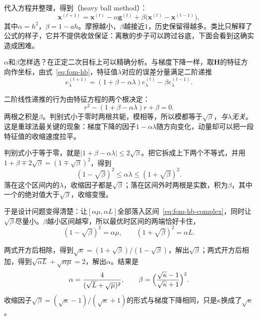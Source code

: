 代入方程并整理，得到（heavy ball method）：
\begin{equation}
 \bm{x}^{(t+1)}=\bm{x}^{(t)}-\alpha\bm{g}^{(t)}+\beta\bigl(\bm{x}^{(t)}-\bm{x}^{(t-1)}\bigr),
 \label{eq:fom-hb}
\end{equation}
其中$\alpha=h^2$，$\beta=1-ah$。摩擦越小，$\beta$越接近$1$，历史保留得越多。类比只解释了公式的样子，它并不提供收敛保证：离散的步子可以跨过谷底，下面会看到这确实造成困难。

$\alpha$和$\beta$怎样选？在正定二次目标上可以精确分析。与梯度下降一样，取$\bm{H}$的特征方向作坐标，由式~\eqref{eq:fom-hb}，特征值$\lambda$对应的误差分量满足二阶递推
\begin{equation}
 e_\lambda^{(t+1)}=(1+\beta-\alpha\lambda)e_\lambda^{(t)}-\beta e_\lambda^{(t-1)}.
 \label{eq:fom-hb-scalar}
\end{equation}

二阶线性递推的行为由特征方程的两个根决定：
\begin{equation}
 r^2-(1+\beta-\alpha\lambda)r+\beta=0.
 \label{eq:fom-hb-char}
\end{equation}
两根之积是$\beta$。判别式小于零时两根共轭，模相等，所以模都等于$\sqrt\beta$，\emph{与$\lambda$无关}。这是重球法最关键的现象：梯度下降的因子$1-\alpha\lambda$随方向变化，动量却可以把一段特征值的收缩速度拉平。

判别式小于等于零，就是$\lvert1+\beta-\alpha\lambda\rvert\leq2\sqrt\beta$。把它拆成上下两个不等式，并用$1+\beta\mp2\sqrt\beta=(1\mp\sqrt\beta)^2$，得到
\begin{equation}
 (1-\sqrt\beta)^2\leq\alpha\lambda\leq(1+\sqrt\beta)^2.
 \label{eq:fom-hb-complex}
\end{equation}
落在这个区间内的$\lambda$，收缩因子都是$\sqrt\beta$；落在区间外时两根是实数，积为$\beta$，其中一个的绝对值大于$\sqrt\beta$，收缩变慢。

于是设计问题变得清楚：让$[\alpha\mu,\alpha L]$全部落入区间~\eqref{eq:fom-hb-complex}，同时让$\sqrt\beta$尽量小。$\beta$越小区间越窄，所以最优时区间的两端恰好卡住，
\[
 (1-\sqrt\beta)^2=\alpha\mu,\qquad(1+\sqrt\beta)^2=\alpha L.
\]

两式开方后相除，得到$\sqrt\kappa=(1+\sqrt\beta)/(1-\sqrt\beta)$，解出$\sqrt\beta$；两式开方后相加，得到$\sqrt{\alpha L}+\sqrt{\alpha\mu}=2$，解出$\alpha$。结果是
\begin{equation}
 \alpha=\frac{4}{(\sqrt L+\sqrt\mu)^2},\qquad
 \beta=\Bigl(\frac{\sqrt\kappa-1}{\sqrt\kappa+1}\Bigr)^2.
 \label{eq:fom-hb-params}
\end{equation}
收缩因子$\sqrt\beta=(\sqrt\kappa-1)/(\sqrt\kappa+1)$的形式与梯度下降相同，只是$\kappa$换成了$\sqrt\kappa$。

